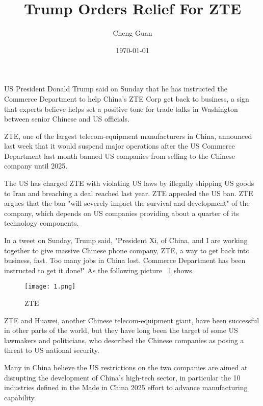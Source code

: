 \documentclass[a4paper,twocolumn]{article}
\title{Trump Orders Relief For ZTE}
\author{Cheng Guan}
\date{\today}
\begin{document}
\maketitle
\balance
US President Donald Trump said on Sunday that he has instructed the Commerce Department
to help China's ZTE Corp get back to business, a sign that experts believe
helps set a positive tone for trade talks in Washington between senior Chinese and US officials.

ZTE, one of the largest telecom-equipment manufacturers in China,
announced last week that it would suspend major operations after the US Commerce Department
last month banned US companies from selling to the Chinese company until 2025.

The US has charged ZTE with violating US laws by illegally shipping US goods to Iran and
breaching a deal reached last year. ZTE appealed the US ban. ZTE argues that
the ban "will severely impact the survival and development" of the company,
which depends on US companies providing about a quarter of its technology components.

In a tweet on Sunday, Trump said, "President Xi, of China, and I are working together to give massive Chinese phone company, ZTE, a way to get back into business, fast.
Too many jobs in China lost. Commerce Department has been instructed to get it done!"\cite{test2}
As the following picture ~\ref{fig1} shows.
\begin{figure}[H]
\centering
\texttt{[image: 1.png]}
\caption{ZTE}
\label{fig1}
\end{figure}


ZTE and Huawei, another Chinese telecom-equipment giant,
have been successful in other parts of the world, but they have long been the target of some US lawmakers and politicians,
 who described the Chinese companies as posing a threat to US national security.

Many in China believe the US restrictions on the two companies are aimed at
disrupting the development of China's high-tech sector,
in particular the 10 industries defined in the Made in China 2025 effort to advance manufacturing capability.




\end{document}
